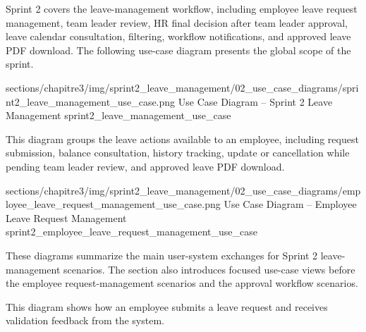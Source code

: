 \clearpage
{}


{\fontsize{12}{18}\selectfont
\setlength{\parindent}{1.2cm}
\setlength{\parskip}{6pt}

\indent Sprint 2 covers the leave-management workflow, including employee leave request management, team leader review, HR final decision after team leader approval, leave calendar consultation, filtering, workflow notifications, and approved leave PDF download. The following use-case diagram presents the global scope of the sprint.

}

\ChapterThreeFigure
{sections/chapitre3/img/sprint2_leave_management/02_use_case_diagrams/sprint2_leave_management_use_case.png}
{Use Case Diagram -- Sprint 2 Leave Management}
{sprint2_leave_management_use_case}



\Needspace{8.5cm}

\noindent This diagram groups the leave actions available to an employee, including request submission, balance consultation, history tracking, update or cancellation while pending team leader review, and approved leave PDF download.\par

\ChapterThreeFigure
{sections/chapitre3/img/sprint2_leave_management/02_use_case_diagrams/employee_leave_request_management_use_case.png}
{Use Case Diagram -- Employee Leave Request Management}
{sprint2_employee_leave_request_management_use_case}


{\fontsize{12}{18}\selectfont
\setlength{\parindent}{1.2cm}
\setlength{\parskip}{6pt}

\indent These diagrams summarize the main user-system exchanges for Sprint 2 leave-management scenarios. The section also introduces focused use-case views before the employee request-management scenarios and the approval workflow scenarios.

} 
\Needspace{7.2cm}

\noindent This diagram shows how an employee submits a leave request and receives validation feedback from the system.\par


